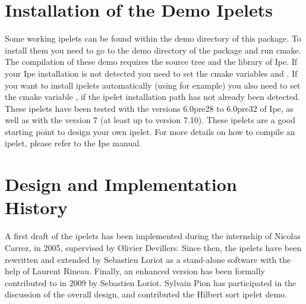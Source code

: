 \section{Installation of the Demo Ipelets}
Some working ipelets can be found within
the demo directory of this package. To install them you need
to go to the demo directory of the package and run cmake.
The compilation of these demo requires the source tree and the library of Ipe.
If your Ipe installation is not detected you need to set the cmake
variables  and . If you want
to install ipelets automatically (using  for example)
you also need to set the cmake variable , 
if the ipelet installation path has not already been detected.
These ipelets have been tested with the versions 6.0pre28 to 6.0pre32 of Ipe,
as well as with the version 7 (at least up to version 7.10).
These ipelets are a good starting point to design your own ipelet. For more details on how
to compile an ipelet, please refer to the Ipe manual.



\section{Design and Implementation History}
A first draft of the \cgal{} ipelets has been implemented during the
internship of Nicolas Carrez, in 2005, supervised by Olivier Devillers.
Since then, the ipelets have been rewritten and extended by Sebastien
Loriot as a stand-alone software with the help of Laurent Rineau.
Finally, an enhanced version has been formally contributed to \cgal{} in 2009
by Sebastien Loriot. Sylvain Pion has participated in the discussion
of the overall design, and contributed the Hilbert sort ipelet demo.
